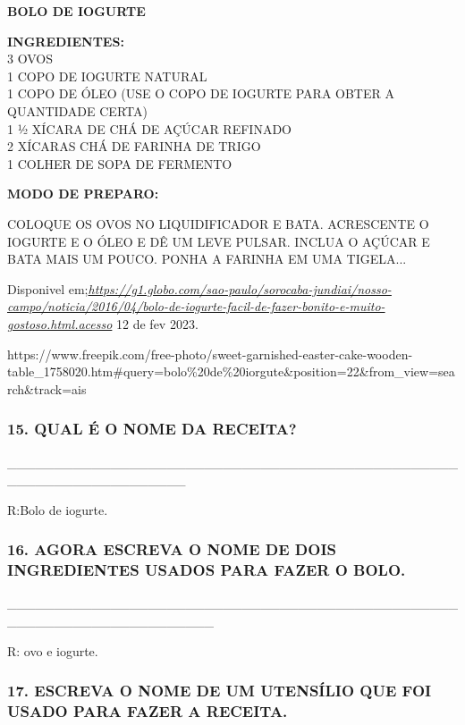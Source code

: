 \textbf{BOLO DE IOGURTE}

\textbf{INGREDIENTES:}\\
3 OVOS\\
1 COPO DE IOGURTE NATURAL\\
1 COPO DE ÓLEO (USE O COPO DE IOGURTE PARA OBTER A QUANTIDADE CERTA)\\
1 ½ XÍCARA DE CHÁ DE AÇÚCAR REFINADO\\
2 XÍCARAS CHÁ DE FARINHA DE TRIGO\\
1 COLHER DE SOPA DE FERMENTO

\textbf{MODO DE PREPARO:}

COLOQUE OS OVOS NO LIQUIDIFICADOR E BATA. ACRESCENTE O IOGURTE E O ÓLEO
E DÊ UM LEVE PULSAR. INCLUA O AÇÚCAR E BATA MAIS UM POUCO. PONHA A
FARINHA EM UMA TIGELA...

Disponivel
em;\href{https://g1.globo.com/sao-paulo/sorocaba-jundiai/nosso-campo/noticia/2016/04/bolo-de-iogurte-facil-de-fazer-bonito-e-muito-gostoso.html.acesso}{\emph{https://g1.globo.com/sao-paulo/sorocaba-jundiai/nosso-campo/noticia/2016/04/bolo-de-iogurte-facil-de-fazer-bonito-e-muito-gostoso.html.acesso}}
12 de fev 2023.

https://www.freepik.com/free-photo/sweet-garnished-easter-cake-wooden-table\_1758020.htm\#query=bolo\%20de\%20iorgute\&position=22\&from\_view=search\&track=ais

\subsubsection{15. QUAL É O NOME DA
RECEITA?}\label{qual-uxe9-o-nome-da-receita}

\_\_\_\_\_\_\_\_\_\_\_\_\_\_\_\_\_\_\_\_\_\_\_\_\_\_\_\_\_\_\_\_\_\_\_\_\_\_\_\_\_\_\_\_\_\_\_\_\_\_\_\_\_\_\_\_\_\_\_\_\_\_\_\_\_\_\_

R:Bolo de iogurte.

\subsubsection{16. AGORA ESCREVA O NOME DE DOIS INGREDIENTES USADOS PARA
FAZER O
BOLO.}\label{agora-escreva-o-nome-de-dois-ingredientes-usados-para-fazer-o-bolo.}

\_\_\_\_\_\_\_\_\_\_\_\_\_\_\_\_\_\_\_\_\_\_\_\_\_\_\_\_\_\_\_\_\_\_\_\_\_\_\_\_\_\_\_\_\_\_\_\_\_\_\_\_\_\_\_\_\_\_\_\_\_\_\_\_\_\_\_\_\_\_

R: ovo e iogurte.

\subsubsection{17. ESCREVA O NOME DE UM UTENSÍLIO QUE FOI USADO PARA
FAZER A RECEITA.
}\label{escreva-o-nome-de-um-utensuxedlio-que-foi-usado-para-fazer-a-receita.}

